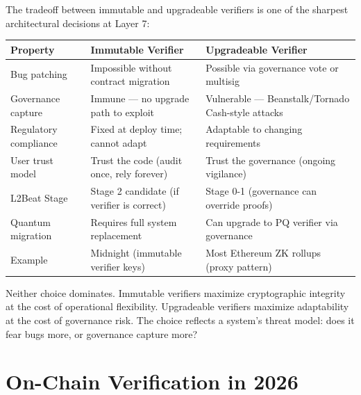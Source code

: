 \documentclass[
  11pt,
  openany]{report}
\begin{document}
The tradeoff between immutable and upgradeable verifiers is one of the sharpest
architectural decisions at Layer 7:

\begin{longtable}[]{@{}
  >{\raggedright\arraybackslash}p{}
  >{\raggedright\arraybackslash}p{}
  >{\raggedright\arraybackslash}p{}@{}}
\toprule\noalign{}
\begin{minipage}[b]{\linewidth}\raggedright
Property
\end{minipage} & \begin{minipage}[b]{\linewidth}\raggedright
Immutable Verifier
\end{minipage} & \begin{minipage}[b]{\linewidth}\raggedright
Upgradeable Verifier
\end{minipage} \\
\midrule\noalign{}
\arrayrulecolor{MidnightBlue}\midrule\arrayrulecolor{MidnightBorder}
\endhead
\bottomrule\noalign{}
\endlastfoot
Bug patching & Impossible without contract migration & Possible via governance
vote or multisig \\
Governance capture & Immune --- no upgrade path to exploit & Vulnerable ---
Beanstalk/Tornado Cash-style attacks \\
Regulatory compliance & Fixed at deploy time; cannot adapt & Adaptable to
changing requirements \\
User trust model & Trust the code (audit once, rely forever) & Trust the
governance (ongoing vigilance) \\
L2Beat Stage & Stage 2 candidate (if verifier is correct) & Stage 0-1
(governance can override proofs) \\
Quantum migration & Requires full system replacement & Can upgrade to PQ
verifier via governance \\
Example & Midnight (immutable verifier keys) & Most Ethereum ZK rollups (proxy
pattern) \\
\end{longtable}

Neither choice dominates. Immutable verifiers maximize cryptographic integrity
at the cost of operational flexibility. Upgradeable verifiers maximize
adaptability at the cost of governance risk. The choice reflects a system's
threat model: does it fear bugs more, or governance capture more?

\section{On-Chain Verification in 2026}\label{on-chain-verification-in-2026}
\end{document}
